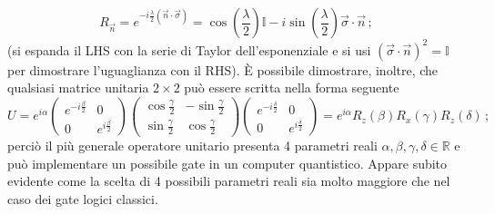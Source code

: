 \begin{equation}\label{rotation_n_lambda}
    R_{\vec{n}} = e^{-i \frac{\lambda}{2} (\vec n \cdot \vec \sigma)} = \cos \! \left( \frac{\lambda}{2} \right) \mathbb{I} - i \sin \! \left( \frac{\lambda}{2} \right) \vec \sigma \cdot \vec n \, ;
\end{equation}
(si espanda il LHS con la serie di Taylor dell'esponenziale e si usi $(\vec \sigma \cdot \vec n)^2 = \mathbb{I}$ per dimostrare l'uguaglianza con il RHS). È possibile dimostrare, inoltre, che qualsiasi matrice unitaria $2 \times 2$ può essere scritta nella forma seguente
\begin{equation}\label{general_2by2_matrix}
    U = e^{i \alpha}
    \begin{pmatrix}
        e^{-i \frac{\beta}{2}} & 0 \\ 0 & e^{i \frac{\beta}{2}}
    \end{pmatrix}
    \begin{pmatrix}
        \cos \frac{\gamma}{2} & - \sin \frac{\gamma}{2} \\ \sin  \frac{\gamma}{2} & \cos \frac{\gamma}{2}
    \end{pmatrix}
    \begin{pmatrix}
        e^{-i \frac{\delta}{2}} & 0 \\ 0 & e^{i \frac{\delta}{2}}
    \end{pmatrix}
    = e^{i \alpha} R_z(\beta) R_x(\gamma) R_z(\delta) \, ; 
\end{equation}
perciò il più generale operatore unitario presenta 4 parametri reali $\alpha, \beta, \gamma, \delta \in \mathbb{R}$ e può implementare un possibile gate in un computer quantistico. Appare subito evidente come la scelta di 4 possibili parametri reali sia molto maggiore che nel caso dei gate logici classici. 
